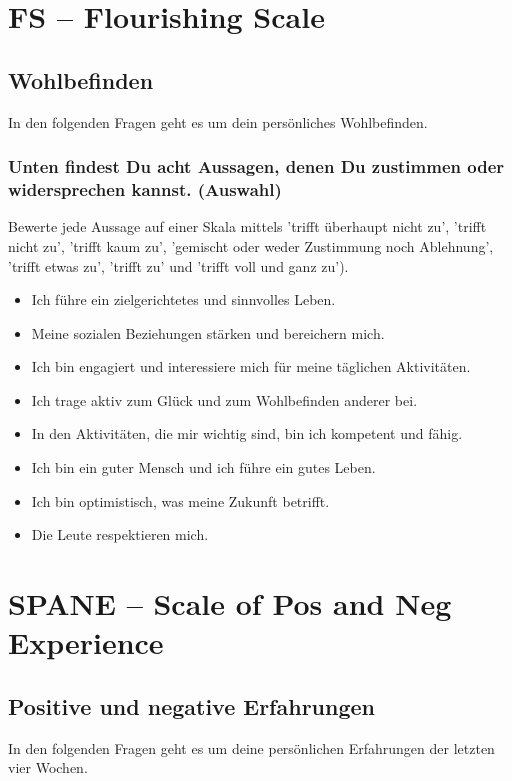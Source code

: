 \section{FS -- Flourishing Scale}\label{anhangSection.fs}   
\subsection*{Wohlbefinden} 
In den folgenden Fragen geht es um dein persönliches Wohlbefinden.
\subsubsection*{Unten findest Du acht Aussagen, denen Du zustimmen oder widersprechen kannst. (Auswahl)}
Bewerte jede Aussage auf einer Skala mittels 'trifft überhaupt nicht zu', 'trifft nicht zu', 'trifft kaum zu', 'gemischt oder weder Zustimmung noch Ablehnung', 'trifft etwas zu', 'trifft zu' und 'trifft voll und ganz zu').
    \begin{itemize}
      \item Ich führe ein zielgerichtetes und sinnvolles Leben.
      \item Meine sozialen Beziehungen stärken und bereichern mich.
      \item Ich bin engagiert und interessiere mich für meine täglichen Aktivitäten.
      \item Ich trage aktiv zum Glück und zum Wohlbefinden anderer bei.
      \item In den Aktivitäten, die mir wichtig sind, bin ich kompetent und fähig.
      \item Ich bin ein guter Mensch und ich führe ein gutes Leben.
      \item Ich bin optimistisch, was meine Zukunft betrifft.
      \item Die Leute respektieren mich.
    \end{itemize}  
\section{SPANE -- Scale of Pos and Neg Experience}\label{anhangSection.spane}   
\subsection*{Positive und negative Erfahrungen} 
In den folgenden Fragen geht es um deine persönlichen Erfahrungen der letzten vier Wochen.
